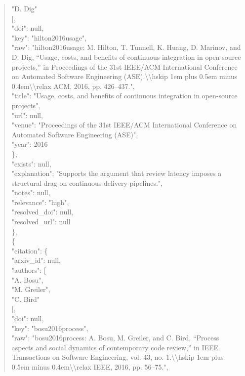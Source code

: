 \documentclass[11pt]{article}
\begin{document}
\begin{quote}
          "D. Dig"\\
        ],\\
        "doi": null,\\
        "key": "hilton2016usage",\\
        "raw": "hilton2016usage: M. Hilton, T. Tunnell, K. Huang, D. Marinov, and D. Dig, ``Usage, costs, and benefits of continuous integration in open-source projects,'' in Proceedings of the 31st IEEE/ACM International Conference on Automated Software Engineering (ASE).\textbackslash{}\textbackslash{}hskip 1em plus 0.5em minus 0.4em\textbackslash{}\textbackslash{}relax ACM, 2016, pp. 426--437.",\\
        "title": "Usage, costs, and benefits of continuous integration in open-source projects",\\
        "url": null,\\
        "venue": "Proceedings of the 31st IEEE/ACM International Conference on Automated Software Engineering (ASE)",\\
        "year": 2016\\
      \},\\
      "exists": null,\\
      "explanation": "Supports the argument that review latency imposes a structural drag on continuous delivery pipelines.",\\
      "notes": null,\\
      "relevance": "high",\\
      "resolved\_doi": null,\\
      "resolved\_url": null\\
    \},\\
    \{\\
      "citation": \{\\
        "arxiv\_id": null,\\
        "authors": [\\
          "A. Bosu",\\
          "M. Greiler",\\
          "C. Bird"\\
        ],\\
        "doi": null,\\
        "key": "bosu2016process",\\
        "raw": "bosu2016process: A. Bosu, M. Greiler, and C. Bird, ``Process aspects and social dynamics of contemporary code review,'' in IEEE Transactions on Software Engineering, vol. 43, no. 1.\textbackslash{}\textbackslash{}hskip 1em plus 0.5em minus 0.4em\textbackslash{}\textbackslash{}relax IEEE, 2016, pp. 56--75.",\\

\end{quote}
\end{document}
